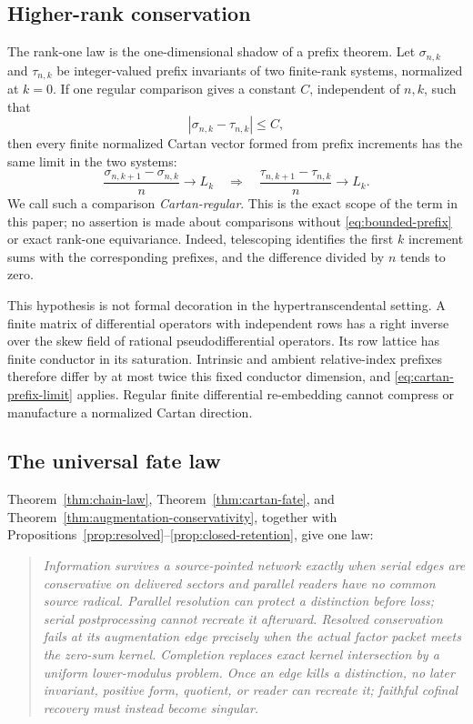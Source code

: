 \documentclass[11pt]{article}
\theoremstyle{definition}
\theoremstyle{remark}
\begin{document}
\subsection{Higher-rank conservation}

The rank-one law is the one-dimensional shadow of a prefix theorem.  Let
\(\sigma_{n,k}\) and \(\tau_{n,k}\) be integer-valued prefix invariants of
two finite-rank systems, normalized at \(k=0\).  If one regular comparison
gives a constant \(C\), independent of \(n,k\), such that
\[
                         |\sigma_{n,k}-\tau_{n,k}|\le C,
\tag{2.14}\label{eq:bounded-prefix}
\]
then every finite normalized Cartan vector formed from prefix increments
has the same limit in the two systems:
\[
 \frac{\sigma_{n,k+1}-\sigma_{n,k}}n\longrightarrow L_k
 \quad\Longrightarrow\quad
 \frac{\tau_{n,k+1}-\tau_{n,k}}n\longrightarrow L_k.
\tag{2.15}\label{eq:cartan-prefix-limit}
\]
We call such a comparison \emph{Cartan-regular}.  This is the exact scope
of the term in this paper; no assertion is made about comparisons without
\eqref{eq:bounded-prefix} or exact rank-one equivariance.
Indeed, telescoping identifies the first \(k\) increment sums with the
corresponding prefixes, and the difference divided by \(n\) tends to zero.

This hypothesis is not formal decoration in the hypertranscendental
setting.  A finite matrix of differential operators with independent rows
has a right inverse over the skew field of rational pseudodifferential
operators.  Its row lattice has finite conductor in its saturation.
Intrinsic and ambient relative-index prefixes therefore differ by at most
twice this fixed conductor dimension, and
\eqref{eq:cartan-prefix-limit} applies.  Regular finite differential
re-embedding cannot compress or manufacture a normalized Cartan
direction.

\subsection{The universal fate law}

Theorem~\ref{thm:chain-law}, Theorem~\ref{thm:cartan-fate}, and
Theorem~\ref{thm:augmentation-conservativity}, together with
Propositions~\ref{prop:resolved}--\ref{prop:closed-retention}, give one
law:

\begin{quote}
\emph{Information survives a source-pointed network exactly when serial
edges are conservative on delivered sectors and parallel readers have no
common source radical.  Parallel resolution can protect a distinction
before loss; serial postprocessing cannot recreate it afterward.
Resolved conservation fails at its augmentation edge precisely when the
actual factor packet meets the zero-sum kernel.  Completion replaces exact
kernel intersection by a uniform lower-modulus problem.  Once an edge
kills a distinction, no later invariant, positive form, quotient, or reader
can recreate it; faithful cofinal recovery must instead become singular.}
\end{quote}
\end{document}
